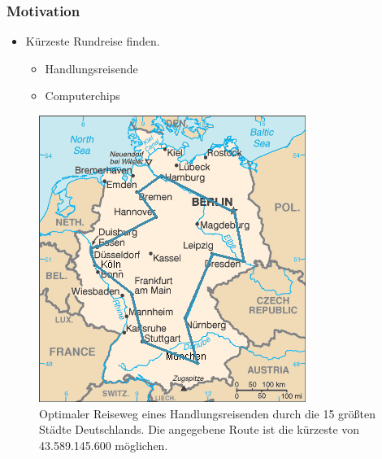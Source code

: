 \begin{frame}
	\frametitle{Motivation}
	 {
		\begin{itemize}
			\item<1-> Kürzeste Rundreise finden.
			      \begin{itemize}
				      \item<2-> 	Handlungsreisende
				      \item<4-> 	Computerchips
			      \end{itemize}
		\end{itemize}}
	 {
		\begin{figure}
			\includegraphics[scale=0.4]{images/TSP_Deutschland_3.png}
			\caption{Optimaler Reiseweg eines Handlungsreisenden durch die 15 größten Städte Deutschlands. Die angegebene Route ist die kürzeste von 43.589.145.600 möglichen.}
		\end{figure}
	}
\end{frame}